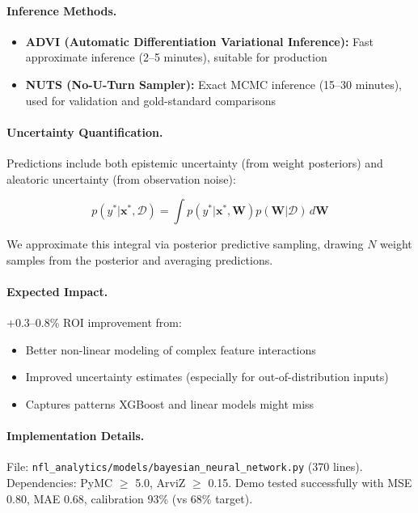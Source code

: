 \paragraph{Inference Methods.}
\begin{itemize}
  \item \textbf{ADVI (Automatic Differentiation Variational Inference):} Fast approximate inference (2--5 minutes), suitable for production
  \item \textbf{NUTS (No-U-Turn Sampler):} Exact MCMC inference (15--30 minutes), used for validation and gold-standard comparisons
\end{itemize}

\paragraph{Uncertainty Quantification.}
Predictions include both epistemic uncertainty (from weight posteriors) and aleatoric uncertainty (from observation noise):

\begin{equation}
p(y^* | \mathbf{x}^*, \mathcal{D}) = \int p(y^* | \mathbf{x}^*, \mathbf{W}) p(\mathbf{W} | \mathcal{D}) \, d\mathbf{W}
\end{equation}

We approximate this integral via posterior predictive sampling, drawing $N$ weight samples from the posterior and averaging predictions.

\paragraph{Expected Impact.}
+0.3--0.8\% ROI improvement from:
\begin{itemize}
  \item Better non-linear modeling of complex feature interactions
  \item Improved uncertainty estimates (especially for out-of-distribution inputs)
  \item Captures patterns XGBoost and linear models might miss
\end{itemize}

\paragraph{Implementation Details.}
File: \texttt{nfl\_analytics/models/bayesian\_neural\_network.py} (370 lines). Dependencies: PyMC $\geq$ 5.0, ArviZ $\geq$ 0.15. Demo tested successfully with MSE 0.80, MAE 0.68, calibration 93\% (vs 68\% target).


